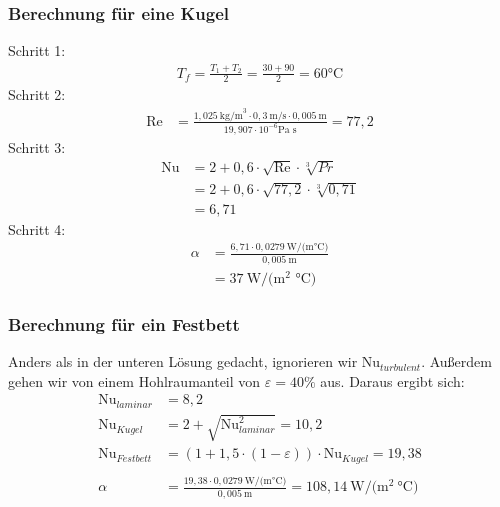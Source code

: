 \documentclass[a4paper,10pt]{article}
\begin{document}
\pp
\subsubsection{Berechnung für eine Kugel}
Schritt 1: 
\begin{align*}
T_f = \frac{T_1 + T_2}{2} = \frac{30 + 90}{2} = 60 \text{°C}
\end{align*}
Schritt 2:
\begin{align*}
\text{Re} &= \frac{1,025~ \text{kg/m}^3 \cdot 0,3~ \text{m/s} \cdot 0,005~\text{m}}{19,907 \cdot 10^{-6} \text{Pa s}} = 77,2
\end{align*}
Schritt 3:
\begin{align*}
\text{Nu} &= 2 + 0,6 \cdot \sqrt{\text{Re}} \cdot \sqrt[3]{Pr}\\
			&= 2 + 0,6 \cdot \sqrt{77,2} \cdot \sqrt[3]{0,71}\\
			&= 6,71
\end{align*}
Schritt 4:
\begin{align*}
\alpha &= \frac{6,71 \cdot 0,0279 ~\text{W/(m°C)}}{0,005 ~\text{m}}\\
		&= 37 ~\text{W/(m$^2$ °C)}
\end{align*}

\subsubsection{Berechnung für ein Festbett}
Anders als in der unteren Lösung gedacht, ignorieren wir Nu$_{turbulent}$. Außerdem gehen wir von einem Hohlraumanteil von $\varepsilon = 40\%$ aus. \pp
Daraus ergibt sich:
\begin{align*}
\text{Nu}_{laminar} &= 8,2 \\
\text{Nu}_{Kugel} &= 2 + \sqrt{\text{Nu}_{laminar}^2} = 10,2 \\
\text{Nu}_{Festbett} &= (1+1,5 \cdot (1-\varepsilon)) \cdot \text{Nu}_{Kugel} = 19,38 \\ \\
\alpha &=  \frac{19,38 \cdot 0,0279 ~\text{W/(m°C)}}{0,005 ~\text{m}} = 108,14 ~\text{W/(m$^2~$°C)}
\end{align*}

\pagebreak

\end{document}
